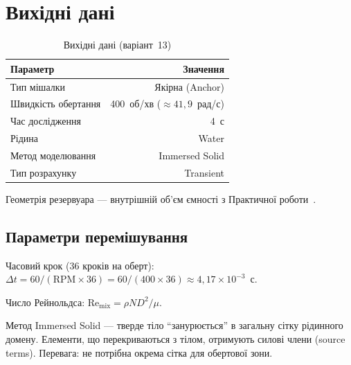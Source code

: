 
\usepackage{../common/labstyle}



\maketitle
\tableofcontents
\newpage

\section{Вихідні дані}

\begin{table}[H]
  \centering
  \caption{Вихідні дані (варіант~13)}
  \begin{tabularx}{0.75\textwidth}{Xr}
    \toprule
    \textbf{Параметр} & \textbf{Значення} \\
    \midrule
    Тип мішалки                  & Якірна (Anchor) \\
    Швидкість обертання          & 400~об/хв ($\approx 41{,}9$~рад/с) \\
    Час дослідження              & 4~с \\
    Рідина                       & Water \\
    Метод моделювання            & Immersed Solid \\
    Тип розрахунку               & Transient \\
    \bottomrule
  \end{tabularx}
\end{table}

Геометрія резервуара --- внутрішній об'єм ємності з Практичної роботи~.

\subsection{Параметри перемішування}

Часовий крок (36 кроків на оберт):
$\Delta t = 60/(\mathrm{RPM} \times 36) = 60/(400 \times 36) \approx 4{,}17 \times 10^{-3}$~с.

Число Рейнольдса: $\mathrm{Re_{mix}} = \rho N D^2 / \mu$.

Метод Immersed Solid --- тверде тіло ``занурюється'' в загальну сітку рідинного домену. Елементи, що перекриваються з тілом, отримують силові члени (source terms). Перевага: не потрібна окрема сітка для обертової зони.

